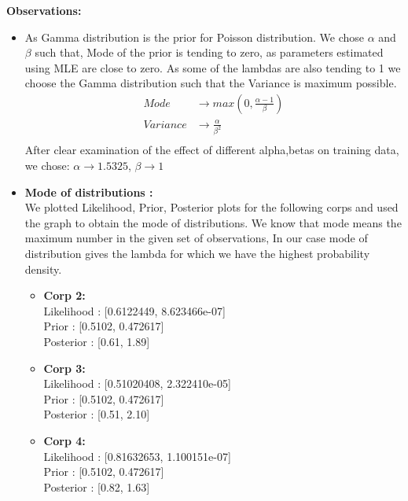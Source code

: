 \documentclass[english,a4paper,12pt]{article}
\begin{document}
\begin{enumerate}
\textbullet\textbf{Observations:}
    \begin{itemize}
        \item As Gamma distribution is the prior for Poisson distribution. We chose $\alpha$ and $\beta$ such that, Mode of the prior is tending to zero, as parameters estimated using MLE are close to zero. As some of the lambdas are also tending to 1 we choose the Gamma distribution such that the Variance is maximum possible.
      \begin{equation} \label{eq1}
\begin{split}
Mode &\rightarrow   max(0,\frac{\alpha -1}{\beta }) \\
Variance &\rightarrow \frac{\alpha}{\beta ^ 2}\\
\end{split}
\end{equation}
After clear examination of the effect of different alpha,betas on training data,\\we chose:
$\alpha \rightarrow 1.5325$,
$\beta \rightarrow 1$
\item \textbf{Mode of distributions :}\\
We plotted Likelihood, Prior, Posterior plots for the following corps and used the graph to obtain the mode of distributions.
We know that mode means the maximum number in the given set of observations, In our case mode of distribution gives the lambda for which we have the highest probability density.
    \begin{itemize}
        \item \textbf{Corp 2:}\\
    Likelihood : [0.6122449, 8.623466e-07]\\
    Prior : [0.5102, 0.472617] \\
    Posterior : [0.61, 1.89]
    \item \textbf{Corp 3:}\\
    Likelihood : [0.51020408, 2.322410e-05]\\
    Prior : [0.5102, 0.472617]\\
    Posterior : [0.51, 2.10]
    \item \textbf{Corp 4:}\\
    Likelihood : [0.81632653, 1.100151e-07]\\
    Prior : [0.5102, 0.472617]\\
    Posterior : [0.82, 1.63]
    \end{itemize}
    \end{itemize}
    

\end{enumerate}
\end{document}
